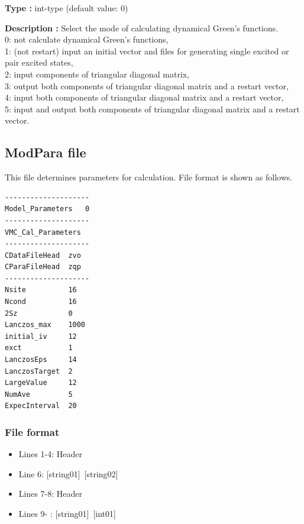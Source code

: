 \begin{itemize}
{\bf Type :} {int-type (default value: 0)}

{\bf Description :} {
{
Select the mode of calculating dynamical Green's functions.\\
0: not calculate  dynamical Green's functions,\\
1: (not restart) input an initial vector and files for generating single excited or pair excited states,\\
2: input components of triangular diagonal matrix, \\
3: output both components of triangular diagonal matrix and a restart vector,\\
4: input both components of triangular diagonal matrix and a restart vector,\\
5: input and output  both components of triangular diagonal matrix and a restart vector.\\
}
}

\end{itemize}

\newpage
\subsection{ModPara file}
\label{Subsec:modpara}
This file determines parameters for calculation. File format is shown as follows.\\
\begin{minipage}{10cm}
\begin{screen}
\begin{verbatim}
--------------------
Model_Parameters   0
--------------------
VMC_Cal_Parameters
--------------------
CDataFileHead  zvo
CParaFileHead  zqp
--------------------
Nsite          16   
Ncond          16    
2Sz            0 
Lanczos_max    1000 
initial_iv     12   
exct           1    
LanczosEps     14   
LanczosTarget  2    
LargeValue     12   
NumAve         5    
ExpecInterval  20   
\end{verbatim}
\end{screen}
\end{minipage}

\subsubsection{File format}
 \begin{itemize}
   \item  Lines 1-4:  Header
   \item  Line 6:  [string01]~[string02]
   \item  Lines 7-8:  Header
   \item  Lines 9- : [string01]~[int01]
  \end{itemize}

